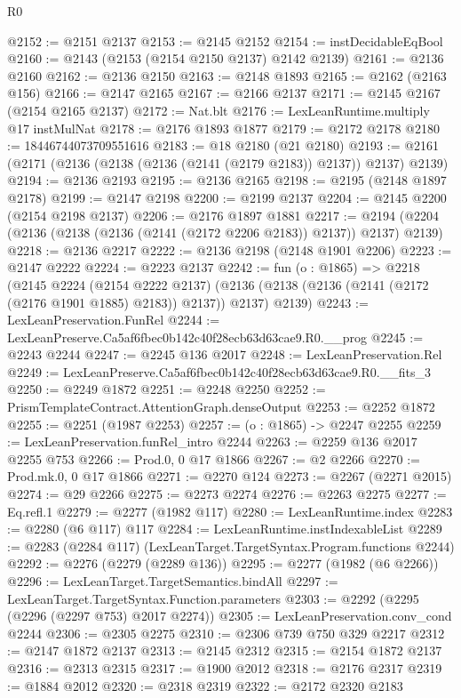 \begin{lexlean}{R0}
\begin{coremodule}
@2152 := @2151 @2137
@2153 := @2145 @2152
@2154 := instDecidableEqBool
@2160 := @2143 (@2153 (@2154 @2150 @2137) @2142 @2139)
@2161 := @2136 @2160
@2162 := @2136 @2150
@2163 := @2148 @1893
@2165 := @2162 (@2163 @156)
@2166 := @2147 @2165
@2167 := @2166 @2137
@2171 := @2145 @2167 (@2154 @2165 @2137)
@2172 := Nat.blt
@2176 := LexLeanRuntime.multiply @17 instMulNat
@2178 := @2176 @1893 @1877
@2179 := @2172 @2178
@2180 := 18446744073709551616
@2183 := @18 @2180 (@21 @2180)
@2193 := @2161 (@2171 (@2136 (@2138 (@2136 (@2141 (@2179 @2183)) @2137)) @2137) @2139)
@2194 := @2136 @2193
@2195 := @2136 @2165
@2198 := @2195 (@2148 @1897 @2178)
@2199 := @2147 @2198
@2200 := @2199 @2137
@2204 := @2145 @2200 (@2154 @2198 @2137)
@2206 := @2176 @1897 @1881
@2217 := @2194 (@2204 (@2136 (@2138 (@2136 (@2141 (@2172 @2206 @2183)) @2137)) @2137) @2139)
@2218 := @2136 @2217
@2222 := @2136 @2198 (@2148 @1901 @2206)
@2223 := @2147 @2222
@2224 := @2223 @2137
@2242 := fun (o : @1865) =>
  @2218
    (@2145
      @2224
      (@2154 @2222 @2137)
      (@2136 (@2138 (@2136 (@2141 (@2172 (@2176 @1901 @1885) @2183)) @2137)) @2137)
      @2139)
@2243 := LexLeanPreservation.FunRel
@2244 := LexLeanPreserve.Ca5af6fbec0b142c40f28ecb63d63cae9.R0.__prog
@2245 := @2243 @2244
@2247 := @2245 @136 @2017
@2248 := LexLeanPreservation.Rel
@2249 := LexLeanPreserve.Ca5af6fbec0b142c40f28ecb63d63cae9.R0.__fits_3
@2250 := @2249 @1872
@2251 := @2248 @2250
@2252 := PrismTemplateContract.AttentionGraph.denseOutput
@2253 := @2252 @1872
@2255 := @2251 (@1987 @2253)
@2257 := (o : @1865) -> @2247 @2255
@2259 := LexLeanPreservation.funRel_intro @2244
@2263 := @2259 @136 @2017 @2255 @753
@2266 := Prod.{0, 0} @17 @1866
@2267 := @2 @2266
@2270 := Prod.mk.{0, 0} @17 @1866
@2271 := @2270 @124
@2273 := @2267 (@2271 @2015)
@2274 := @29 @2266
@2275 := @2273 @2274
@2276 := @2263 @2275
@2277 := Eq.refl.{1}
@2279 := @2277 (@1982 @117)
@2280 := LexLeanRuntime.index
@2283 := @2280 (@6 @117) @117
@2284 := LexLeanRuntime.instIndexableList
@2289 := @2283 (@2284 @117) (LexLeanTarget.TargetSyntax.Program.functions @2244)
@2292 := @2276 (@2279 (@2289 @136))
@2295 := @2277 (@1982 (@6 @2266))
@2296 := LexLeanTarget.TargetSemantics.bindAll
@2297 := LexLeanTarget.TargetSyntax.Function.parameters
@2303 := @2292 (@2295 (@2296 (@2297 @753) @2017 @2274))
@2305 := LexLeanPreservation.conv_cond @2244
@2306 := @2305 @2275
@2310 := @2306 @739 @750 @329 @2217
@2312 := @2147 @1872 @2137
@2313 := @2145 @2312
@2315 := @2154 @1872 @2137
@2316 := @2313 @2315
@2317 := @1900 @2012
@2318 := @2176 @2317
@2319 := @1884 @2012
@2320 := @2318 @2319
@2322 := @2172 @2320 @2183

\end{coremodule}
\end{lexlean}
